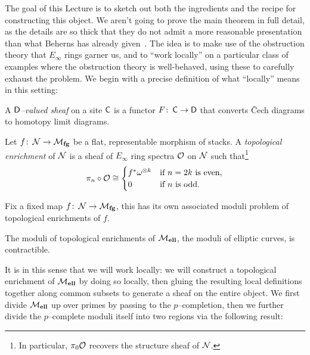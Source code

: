 The goal of this Lecture is to sketch out both the ingredients and the recipe for constructing this object.  We aren't going to prove the main theorem in full detail, as the details are so thick that they do not admit a more reasonable presentation than what Beherns has already given~.  The idea is to make use of the obstruction theory that $E_\infty$ rings garner us, and to ``work locally'' on a particular class of examples where the obstruction theory is well-behaved, using these to carefully exhaust the problem.  We begin with a precise definition of what ``locally'' means in this setting:

\begin{definition}
A \textit{$\mathsf{D}$--valued sheaf} on a site $\mathsf{C}$ is a functor $F\colon\thinspace \mathsf{C} \to \mathsf{D}$ that converts \v{C}ech diagrams to homotopy limit diagrams.
\end{definition}

\begin{definition}
Let $f\colon\thinspace \mathcal{N} \to \mathcal{M}_{\mathbf{fg}}$ be a flat, representable morphism of stacks.  A \textit{topological enrichment} of $\mathcal{N}$ is a sheaf of $E_\infty$ ring spectra $\mathcal{O}$ on $\mathcal{N}$ such that\footnote{In particular, $\pi_0 \mathcal{O}$ recovers the structure sheaf of $\mathcal{N}$.} \[\pi_n \circ \mathcal{O} \cong \begin{cases} f^* \omega^{\otimes k} & \text{if $n = 2k$ is even}, \\ 0 & \text{if $n$ is odd}. \end{cases}\]
\end{definition}

Fix a fixed map $f\colon\thinspace \mathcal{N} \to \mathcal{M}_{\mathbf{fg}}$, this has its own associated moduli problem of topological enrichments of $f$.

\begin{theorem}
The moduli of topological enrichments of $\mathcal{M}_{\mathbf{ell}}$, the moduli of elliptic curves, is contractible.
\end{theorem}

It is in this sense that we will work locally: we will construct a topological enrichment of $\mathcal{M}_{\mathbf{ell}}$ by doing so locally, then gluing the resulting local definitions together along common subsets to generate a sheaf on the entire object.  We first divide $\mathcal{M}_{\mathbf{ell}}$ up over primes by passing to the $p$--completion, then we further divide the $p$--complete moduli itself into two regions via the following result:

